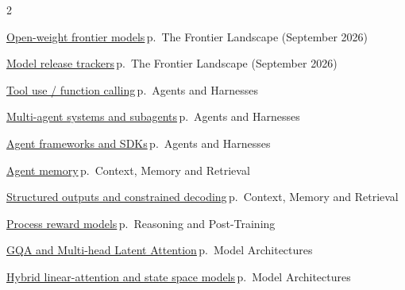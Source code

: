 \documentclass[10pt,a4paper,openany]{report}
\begin{document}
\begin{multicols}{2}\small\raggedright
\hyperref[c:landscape-3]{Open-weight frontier models}\,{\color{muted}\scriptsize p.\,\pageref{c:landscape-3}} {\color{muted}\scriptsize The Frontier Landscape (September 2026)}\par\vspace{2pt}
\hyperref[c:landscape-4]{Model release trackers}\,{\color{muted}\scriptsize p.\,\pageref{c:landscape-4}} {\color{muted}\scriptsize The Frontier Landscape (September 2026)}\par\vspace{2pt}
\hyperref[c:agents-5]{Tool use / function calling}\,{\color{muted}\scriptsize p.\,\pageref{c:agents-5}} {\color{muted}\scriptsize Agents and Harnesses}\par\vspace{2pt}
\hyperref[c:agents-7]{Multi-agent systems and subagents}\,{\color{muted}\scriptsize p.\,\pageref{c:agents-7}} {\color{muted}\scriptsize Agents and Harnesses}\par\vspace{2pt}
\hyperref[c:agents-12]{Agent frameworks and SDKs}\,{\color{muted}\scriptsize p.\,\pageref{c:agents-12}} {\color{muted}\scriptsize Agents and Harnesses}\par\vspace{2pt}
\hyperref[c:context-4]{Agent memory}\,{\color{muted}\scriptsize p.\,\pageref{c:context-4}} {\color{muted}\scriptsize Context, Memory and Retrieval}\par\vspace{2pt}
\hyperref[c:context-9]{Structured outputs and constrained decoding}\,{\color{muted}\scriptsize p.\,\pageref{c:context-9}} {\color{muted}\scriptsize Context, Memory and Retrieval}\par\vspace{2pt}
\hyperref[c:reasoning-8]{Process reward models}\,{\color{muted}\scriptsize p.\,\pageref{c:reasoning-8}} {\color{muted}\scriptsize Reasoning and Post-Training}\par\vspace{2pt}
\hyperref[c:arch-1]{GQA and Multi-head Latent Attention}\,{\color{muted}\scriptsize p.\,\pageref{c:arch-1}} {\color{muted}\scriptsize Model Architectures}\par\vspace{2pt}
\hyperref[c:arch-4]{Hybrid linear-attention and state space models}\,{\color{muted}\scriptsize p.\,\pageref{c:arch-4}} {\color{muted}\scriptsize Model Architectures}\par\vspace{2pt}

\end{multicols}
\end{document}
